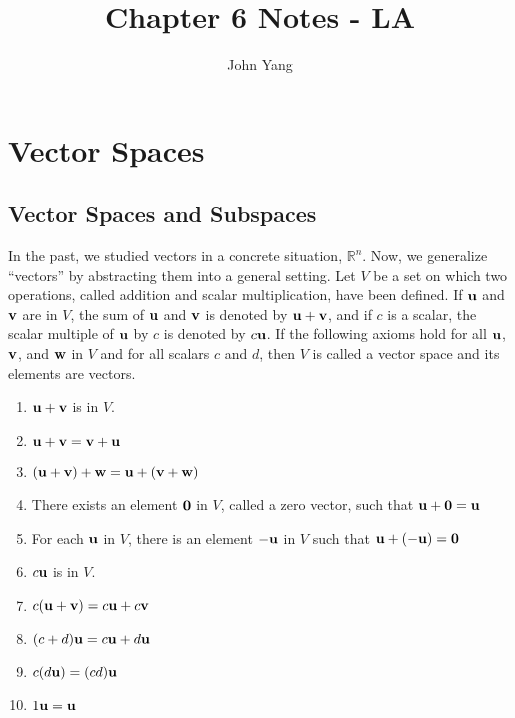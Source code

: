 \documentclass{article}
\title{Chapter 6 Notes - LA} %
\author{John Yang}
\begin{document}
    \maketitle
    \tableofcontents
    \section{Vector Spaces}
    \subsection{Vector Spaces and Subspaces}
    \begin{outline}
        \1 In the past, we studied vectors in a concrete situation, \(\mathbb R^n\). Now, we generalize ``vectors'' by abstracting them into a general setting. 
        \1 Let $V$ be a set on which two operations, called addition and scalar multiplication, have been defined. If \(\vb u\) and \(\vb v\) are in $V$, the sum of \(\vb u\) and \(\vb v\) is denoted by \(\vb u+\vb v\), and if $c$ is a scalar, the scalar multiple of $\vb u$ by $c$ is denoted by \(c\vb u\). If the following axioms hold for all \(\vb u\), \(\vb v\), and \(\vb w\) in $V$ and for all scalars \(c\) and \(d\), then $V$ is called a vector space and its elements are vectors. 
    \end{outline}
    \begin{enumerate}
        \item \(\vb u+\vb v\) is in $V$. 
        \item \(\vb u+\vb v=\vb v+\vb u\)
        \item \((\vb u+\vb v)+\vb w=\vb u+(\vb v+\vb w)\)
        \item There exists an element $\vb 0$ in $V$, called a zero vector, such that \(\vb u+\vb 0=\vb u\)
        \item For each \(\vb u\) in $V$, there is an element \(-\vb u\) in $V$ such that \(\vb u+(-\vb u)=\vb 0\)
        \item \(c\vb u\) is in $V$. 
        \item \(c(\vb u+\vb v)=c\vb u+c\vb v\)
        \item \((c+d)\vb u=c\vb u+d\vb u\)
        \item \(c(d\vb u)=(cd)\vb u\)
        \item \(1\vb u=\vb u\)
    \end{enumerate}
\end{document}
